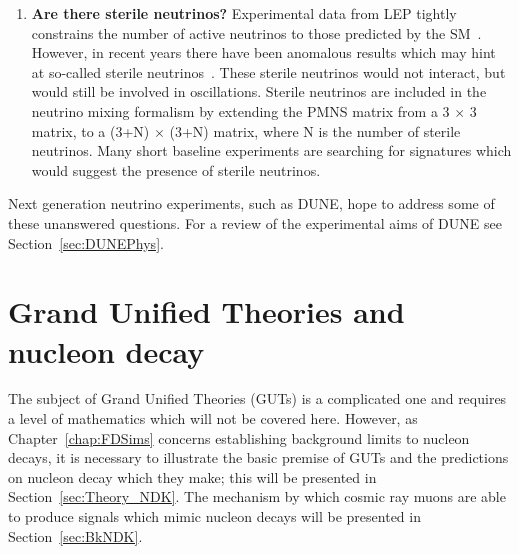 \begin{enumerate}
\item \textbf{Are there sterile neutrinos?} Experimental data from LEP tightly constrains the number of active neutrinos to those predicted by the SM~\citep{LEP}. However, in recent years there have been anomalous results which may hint at so-called sterile neutrinos~\citep{LSND1, LSND2, MiniBooNE}. These sterile neutrinos would not interact, but would still be involved in oscillations. Sterile neutrinos are included in the neutrino mixing formalism by extending the PMNS matrix from a 3 $\times$ 3 matrix, to a (3+N) $\times$ (3+N) matrix, where N is the number of sterile neutrinos. Many short baseline experiments are searching for signatures which would suggest the presence of sterile neutrinos.  
\end{enumerate}
Next generation neutrino experiments, such as DUNE, hope to address some of these unanswered questions. For a review of the experimental aims of DUNE see Section~\ref{sec:DUNEPhys}. \\

\section{Grand Unified Theories and nucleon decay}  \label{sec:Theory_GUT} %
The subject of Grand Unified Theories (GUTs) is a complicated one and requires a level of mathematics which will not be covered here. However, as Chapter~\ref{chap:FDSims} concerns establishing background limits to nucleon decays, it is necessary to illustrate the basic premise of GUTs and the predictions on nucleon decay which they make; this will be presented in Section~\ref{sec:Theory_NDK}. The mechanism by which cosmic ray muons are able to produce signals which mimic nucleon decays will be presented in Section~\ref{sec:BkNDK}.\\

